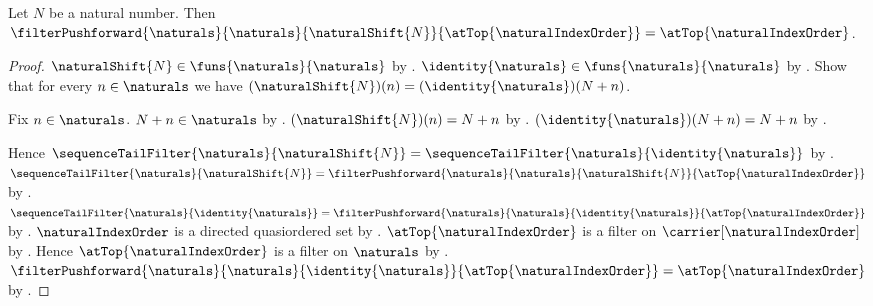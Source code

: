 \begin{theorem}\label{natural_shift_pushforward_at_top}
    Let $N$ be a natural number.
    Then
        $\filterPushforward{\naturals}{\naturals}{\naturalShift{N}}
            {\atTop{\naturalIndexOrder}}
        =\atTop{\naturalIndexOrder}$.
\end{theorem}
\begin{proof}
    $\naturalShift{N}\in\funs{\naturals}{\naturals}$ by
        .
    $\identity{\naturals}\in\funs{\naturals}{\naturals}$ by
        .
    Show that for every $n\in\naturals$ we have
        $(\naturalShift{N})(n)=(\identity{\naturals})(N+n)$.
    \begin{subproof}
        Fix $n\in\naturals$.
        $N+n\in\naturals$ by .
        $(\naturalShift{N})(n)=N+n$ by .
        $(\identity{\naturals})(N+n)=N+n$ by .
    \end{subproof}
    Hence $\sequenceTailFilter{\naturals}{\naturalShift{N}}
        =\sequenceTailFilter{\naturals}{\identity{\naturals}}$ by
        .
    $\sequenceTailFilter{\naturals}{\naturalShift{N}}
        =\filterPushforward{\naturals}{\naturals}{\naturalShift{N}}
            {\atTop{\naturalIndexOrder}}$ by
        .
    $\sequenceTailFilter{\naturals}{\identity{\naturals}}
        =\filterPushforward{\naturals}{\naturals}{\identity{\naturals}}
            {\atTop{\naturalIndexOrder}}$ by
        .
    $\naturalIndexOrder$ is a directed quasiordered set by
        .
    $\atTop{\naturalIndexOrder}$ is a filter on
        $\carrier[\naturalIndexOrder]$ by .
    Hence $\atTop{\naturalIndexOrder}$ is a filter on $\naturals$ by
        .
    $\filterPushforward{\naturals}{\naturals}{\identity{\naturals}}
        {\atTop{\naturalIndexOrder}}=\atTop{\naturalIndexOrder}$ by
        .
\end{proof}
